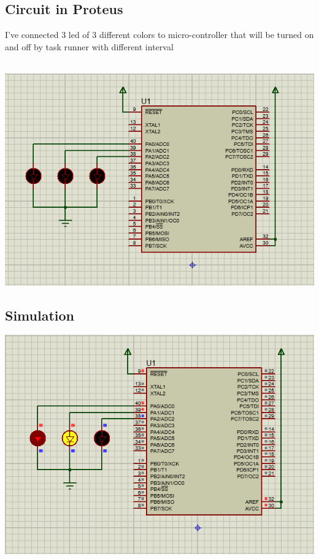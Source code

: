 
\newpage
\subsection{Circuit in Proteus}
I've connected 3 led of 3 different colors to micro-controller that will be turned on and off by task runner with different interval\\\\
\centerline{
	\includegraphics[width=1.0\textwidth]{solution/images/schematics.png}
}

\subsection{Simulation}
\centerline{
	\includegraphics[width=1.0\textwidth]{solution/images/result.png}
}

